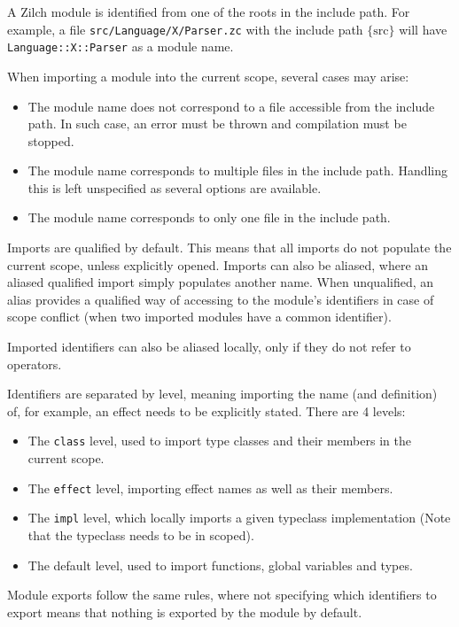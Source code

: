 A Zilch module is identified from one of the roots in the include path.
For example, a file \verb|src/Language/X/Parser.zc| with the include path $\{ \text{src} \}$ will have \verb|Language::X::Parser| as a module name.

When importing a module into the current scope, several cases may arise:
\begin{itemize}
	\item The module name does not correspond to a file accessible from the include path.
	      In such case, an error must be thrown and compilation must be stopped.
	\item The module name corresponds to multiple files in the include path.
	      Handling this is left unspecified as several options are available.
	\item The module name corresponds to only one file in the include path.
\end{itemize}

Imports are qualified by default.
This means that all imports do not populate the current scope, unless explicitly opened.
Imports can also be aliased, where an aliased qualified import simply populates another name.
When unqualified, an alias provides a qualified way of accessing to the module's identifiers in case of scope conflict (when two imported modules have a common identifier).

Imported identifiers can also be aliased locally, only if they do not refer to operators.

Identifiers are separated by level, meaning importing the name (and definition) of, for example, an effect needs to be explicitly stated.
There are 4 levels:
\begin{itemize}
	\item The \verb|class| level, used to import type classes and their members in the current scope.
	\item The \verb|effect| level, importing effect names as well as their members.
	\item The \verb|impl| level, which locally imports a given typeclass implementation (Note that the typeclass needs to be in scoped).
	\item The default level, used to import functions, global variables and types.
\end{itemize}


Module exports follow the same rules, where not specifying which identifiers to export means that nothing is exported by the module by default.



\endgroup

